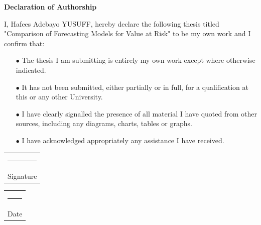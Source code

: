 \thispagestyle{empty}

\newpage\null\thispagestyle{empty}\newpage


\begin{titlepage}
	\textbf{\LARGE Declaration of Authorship}\newline\newline
	

		
		I, Hafees Adebayo YUSUFF, hereby declare the following thesis titled "Comparison of Forecasting Models for Value at Risk" to be my own work and I confirm that:
			\begin{itemize}
		\item[$\bullet$] The thesis I am submitting is entirely my own work except where otherwise indicated.
		
		\item[$\bullet$] It has not been submitted, either partially or in full, for a qualification at this or any other University.
	
	\item[$\bullet$] I have clearly signalled the presence of all material I have quoted from other sources,
	including any diagrams, charts, tables or graphs.
	
	\item[$\bullet$] I have acknowledged appropriately any assistance I have received.
	
	\end{itemize}
	
	\vspace*{4em}\noindent
	\hfill%
	\begin{tabular}[t]{c}
		\rule{10em}{0.4pt}\\ Signature
	\end{tabular}%
	\hfill%
	\begin{tabular}[t]{c}
		\rule{10em}{0.4pt}\\ Date
	\end{tabular}%
	\hfill\strut


\end{titlepage}

\thispagestyle{empty}

\newpage\null\thispagestyle{empty}\newpage

